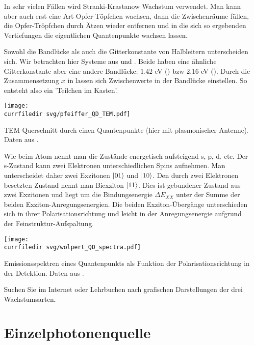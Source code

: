 In sehr vielen Fällen wird Stranki-Krastanow Wachstum verwendet. Man kann aber auch erst eine Art Opfer-Töpfchen wachsen, dann die Zwischenräume füllen, die Opfer-Tröpfchen durch Ätzen wieder entfernen und in die sich so ergebenden Vertiefungen die eigentlichen Quantenpunkte wachsen lassen. 



Sowohl die Bandlücke als auch die Gitterkonstante von Halbleitern unterscheiden sich.  Wir betrachten hier Systeme aus  und . Beide haben eine ähnliche Gitterkonstante aber eine andere Bandlücke:  1.42 eV () bzw 2.16 eV ().  Durch die Zusammensetzung $x$ in  lassen sich Zwischenwerte in der Bandlücke einstellen. So entsteht also ein 'Teilchen im Kasten'.
\begin{marginfigure}

    \texttt{[image: \\currfiledir svg/pfeiffer\_QD\_TEM.pdf]}
    \caption{TEM-Querschnitt durch einen Quantenpunkte (hier mit plasmonischer Antenne). Daten aus \cite{Pfeiffer2014}.}
\end{marginfigure}

Wie beim Atom nennt man die Zustände energetisch aufsteigend s, p, d, etc. Der s-Zustand kann zwei Elektronen unterschiedlichen Spins aufnehmen. Man unterscheidet daher zwei Exzitonen $\ket{01}$ und $\ket{10}$. Den durch zwei Elektronen besetzten Zustand nennt man Biexziton $\ket{11}$. Dies ist gebundener Zustand aus zwei Exzitonen und liegt um die Bindungsenergie $\Delta E_{XX}$ unter der Summe der beiden Exziton-Anregungsenergien. Die beiden Exziton-Übergänge unterschieden sich in ihrer Polarisationsrichtung und leicht in der Anregungsenergie  aufgrund der Feinstruktur-Aufspaltung.


\begin{marginfigure}
    \texttt{[image: \\currfiledir svg/wolpert\_QD\_spectra.pdf]}
    \caption{Emissionsspektren eines  Quantenpunkts als Funktion der Polarisationsrichtung in der Detektion. Daten aus \cite{Wolpert2012b}.}
\end{marginfigure}


\begin{questions}
    \item Suchen Sie im Internet oder Lehrbuchen nach grafischen Darstellungen der drei Wachstumsarten.
\end{questions}


\section{Einzelphotonenquelle}

